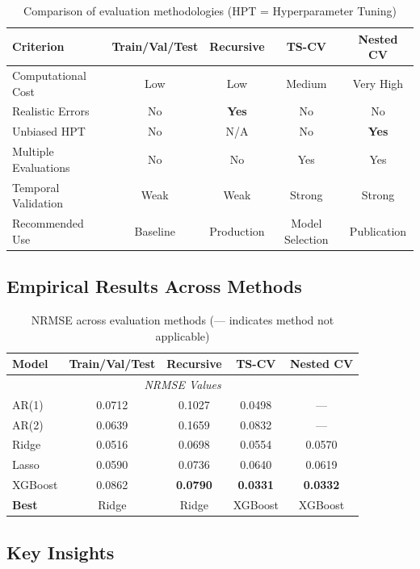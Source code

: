 \documentclass[12pt,a4paper]{article}
\begin{document}
\begin{table}[H]
\centering
\small
\begin{tabular}{lcccc}
\toprule
\textbf{Criterion} & \textbf{Train/Val/Test} & \textbf{Recursive} & \textbf{TS-CV} & \textbf{Nested CV} \\
\midrule
Computational Cost & Low & Low & Medium & Very High \\
Realistic Errors & No & \textbf{Yes} & No & No \\
Unbiased HPT & No & N/A & No & \textbf{Yes} \\
Multiple Evaluations & No & No & Yes & Yes \\
Temporal Validation & Weak & Weak & Strong & Strong \\
Recommended Use & Baseline & Production & Model Selection & Publication \\
\bottomrule
\end{tabular}
\caption{Comparison of evaluation methodologies (HPT = Hyperparameter Tuning)}
\end{table}

\subsection{Empirical Results Across Methods}

\begin{table}[H]
\centering
\begin{tabular}{lcccc}
\toprule
\textbf{Model} & \textbf{Train/Val/Test} & \textbf{Recursive} & \textbf{TS-CV} & \textbf{Nested CV} \\
\midrule
\multicolumn{5}{c}{\textit{NRMSE Values}} \\
\midrule
AR(1)   & 0.0712 & 0.1027 & 0.0498 & --- \\
AR(2)   & 0.0639 & 0.1659 & 0.0832 & --- \\
Ridge   & 0.0516 & 0.0698 & 0.0554 & 0.0570 \\
Lasso   & 0.0590 & 0.0736 & 0.0640 & 0.0619 \\
XGBoost & 0.0862 & \textbf{0.0790} & \textbf{0.0331} & \textbf{0.0332} \\
\midrule
\textbf{Best} & Ridge & Ridge & XGBoost & XGBoost \\
\bottomrule
\end{tabular}
\caption{NRMSE across evaluation methods (--- indicates method not applicable)}
\end{table}

\subsection{Key Insights}
\end{document}
